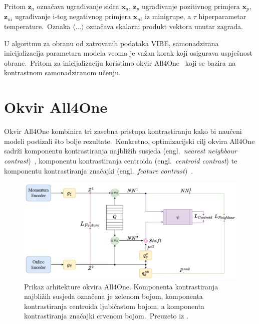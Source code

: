 \documentclass[diplomskirad]{fer}
\begin{document}
Pritom $\bm{z}_{a}$ označava ugrađivanje sidra $\bm{x}_{a}$, $\bm{z}_{p}$ ugrađivanje pozitivnog primjera $\bm{x}_{p}$, $\bm{z}_{ni}$ ugrađivanje i-tog negativnog primjera $\bm{x}_{ni}$ iz minigrupe, a $\tau$ hiperparametar temperature.\ 
Oznaka $\langle ... \rangle$ označava skalarni produkt vektora unutar zagrada.\
  
U algoritmu za obranu od zatrovanih podataka VIBE, samonadzirana inicijalizacija parametara modela veoma je važan korak koji osigurava uspješnost obrane.\ 
Pritom za inicijalizaciju koristimo okvir All4One~\cite{estepa2023all4one} koji se bazira na kontrastnom samonadziranom učenju.\

\section{Okvir All4One}
\label{sek:all4one}

Okvir All4One kombinira tri zasebna pristupa kontrastiranju kako bi naučeni modeli postizali što bolje rezultate.\ 
Konkretno, optimizacijski cilj okvira All4One sadrži komponentu kontrastiranja najbližih susjeda (engl.\ \textit{nearest neighbour contrast})~\cite{dwibedi2021little}, komponentu kontrastiranja centroida (engl.\ \textit{centroid contrast}) te komponentu kontrastiranja značajki (engl.\ \textit{feature contrast})~\cite{zbontar2021barlow}.\ 

\begin{figure}[h]
  \centering
  \includegraphics[scale=0.7]{./Slike/all4one.png}
  \caption{Prikaz arhitekture okvira All4One. Komponenta kontrastiranja najbližih susjeda označena je zelenom bojom, komponenta kontrastiranja centroida ljubičastom bojom, a komponenta kontrastiranja značajki crvenom bojom.\ Preuzeto iz \cite{estepa2023all4one}.}
  \label{fig:all4one}
\end{figure}

\pagebreak
\end{document}
